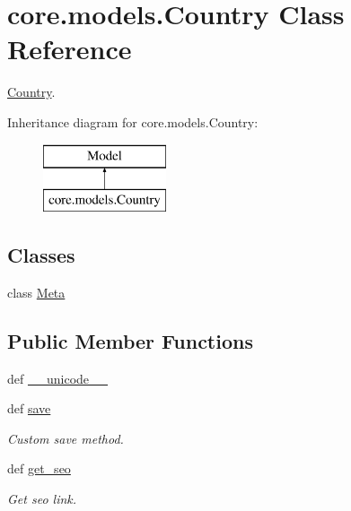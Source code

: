 \hypertarget{classcore_1_1models_1_1Country}{\section{core.\-models.\-Country Class Reference}
\label{classcore_1_1models_1_1Country}
}


\hyperlink{classcore_1_1models_1_1Country}{Country}.  


Inheritance diagram for core.\-models.\-Country\-:\begin{figure}[H]
\begin{center}
\leavevmode
\includegraphics[height=2.000000cm]{classcore_1_1models_1_1Country}
\end{center}
\end{figure}
\subsection*{Classes}
\begin{DoxyCompactItemize}
\item 
class \hyperlink{classcore_1_1models_1_1Country_1_1Meta}{Meta}
\end{DoxyCompactItemize}
\subsection*{Public Member Functions}
\begin{DoxyCompactItemize}
\item 
def \hyperlink{classcore_1_1models_1_1Country_a76f03de6f967f84e57361796365e9a81}{\-\_\-\-\_\-unicode\-\_\-\-\_\-}
\item 
def \hyperlink{classcore_1_1models_1_1Country_a62cf8891c894c8c6aa39bb022b078515}{save}
\begin{DoxyCompactList}\small\item\em Custom save method. \end{DoxyCompactList}\item 
def \hyperlink{classcore_1_1models_1_1Country_aed7e5c275696380b6ef1867bf5c915f4}{get\-\_\-seo}
\begin{DoxyCompactList}\small\item\em Get seo link. \end{DoxyCompactList}\end{DoxyCompactItemize}
